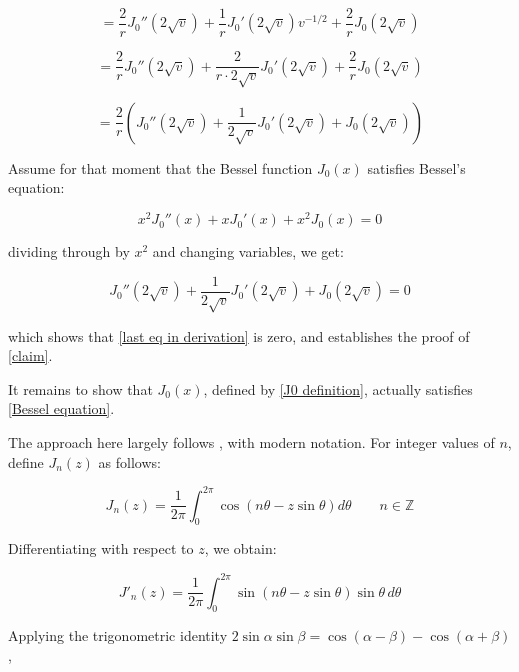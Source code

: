 \documentclass{article}
\begin{document}
\begin{equation*}
=\frac{2}{r} J_0''(2\sqrt{v}) + \frac{1}{r} J_0'(2\sqrt{v}) v^{-1/2} + \frac{2}{r} J_0(2\sqrt{v})
\end{equation*}

\begin{equation*}
=\frac{2}{r} J_0''(2\sqrt{v}) + \frac{2}{r\cdot2\sqrt{v}} J_0'(2\sqrt{v}) + \frac{2}{r} J_0(2\sqrt{v})
\end{equation*}

\begin{equation}
\label{last eq in derivation}
=\frac{2}{r} \left( J_0''(2\sqrt{v}) + \frac{1}{2\sqrt{v}} J_0'(2\sqrt{v}) + J_0(2\sqrt{v})\right)
\end{equation}

Assume for that moment that the Bessel function $J_0(x)$ satisfies Bessel's equation:

\begin{equation}
\label{Bessel equation}
x^2 J_0''(x) + xJ_0'(x) + x^2J_0(x) = 0
\end{equation}

dividing through by $x^2$ and changing variables, we get:

\begin{equation*}
J_0''(2\sqrt{v}) + \frac{1}{2\sqrt{v}}J_0'(2\sqrt{v}) + J_0(2\sqrt{v}) = 0
\end{equation*}

which shows that \eqref{last eq in derivation} is zero, and establishes the proof of \eqref{claim}.

It remains to show that $J_0(x)$, defined by \eqref{J0 definition}, actually satisfies \eqref{Bessel equation}.

The approach here largely follows \cite[p. 92]{Bessel}, with modern notation.  For integer values of $n$,
define $J_n(z)$ as follows:

\begin{equation}
J_n(z) = \frac{1}{2\pi}\int_0^{2\pi} \cos(n\theta - z\sin\theta) d\theta \qquad n\in{\mathbb Z}
\end{equation}

Differentiating with respect to $z$, we obtain:

\begin{equation}
J'_n(z) = \frac{1}{2\pi}\int_0^{2\pi} \sin(n\theta - z\sin\theta) \sin\theta \, d\theta
\end{equation}

Applying the trigonometric identity $2\sin\alpha\sin\beta = \cos(\alpha-\beta)-\cos(\alpha+\beta)$,
\end{document}
